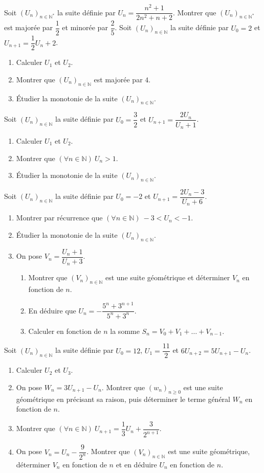 Soit $(U_n)_{n\in\mathbb{N}^*}$ la suite définie par $U_n=\dfrac{n^2+1}{2n^2+n+2}$.
Montrer que $(U_n)_{n\in\mathbb{N}^*}$ est majorée par $\dfrac12$ et minorée par $\dfrac25$.
\fin
Soit $(U_n)_{n\in\mathbb{N}}$ la suite définie par $U_0=2$ et $U_{n+1}=\dfrac12U_n+2$.
\begin{enumerate}
\item Calculer $U_1$ et $U_2$.
\item Montrer que $(U_n)_{n\in\mathbb{N}}$ est majorée par $4$.
\item Étudier la monotonie de la suite $(U_n)_{n\in\mathbb{N}}$.
\end{enumerate}
\fin
{}
Soit $(U_n)_{n\in\mathbb{N}}$ la suite définie par $U_0=\dfrac32$ et $U_{n+1}=\dfrac{2U_n}{U_n+1}$.
\begin{enumerate}
\item Calculer $U_1$ et $U_2$.
\item Montrer que $(\forall n\in\mathbb{N})\ U_n>1$.
\item Étudier la monotonie de la suite $(U_n)_{n\in\mathbb{N}}$.
\end{enumerate}
\fin
{}
Soit $(U_n)_{n\in\mathbb{N}}$ la suite définie par $U_0=-2$ et $U_{n+1}=\dfrac{2U_n-3}{U_n+6}$.
\begin{enumerate}
\item Montrer par récurrence que $(\forall n\in\mathbb{N})\ -3<U_n<-1$.
\item Étudier la monotonie de la suite $(U_n)_{n\in\mathbb{N}}$.
\item On pose $V_n=\dfrac{U_n+1}{U_n+3}$.
\begin{enumerate}
\item Montrer que $(V_n)_{n\in\mathbb{N}}$ est une suite géométrique et déterminer $V_n$ en fonction de $n$.
\item En déduire que $U_n=-\dfrac{5^n+3^{n+1}}{5^n+3^n}$.
\item Calculer en fonction de $n$ la somme $S_n=V_0+V_1+\dots+V_{n-1}$.
\end{enumerate}
\end{enumerate}
\fin
{}
Soit $(U_n)_{n\in\mathbb{N}}$ la suite définie par $U_0=12$, $U_1=\dfrac{11}{2}$ et $6U_{n+2}=5U_{n+1}-U_n$.
\begin{enumerate}
\item Calculer $U_2$ et $U_3$.
\item On pose $W_n=3U_{n+1}-U_n$. Montrer que $(w_n)_{n\geq0}$ est une suite géométrique en précisant sa raison, puis déterminer le terme général $W_n$ en fonction de $n$.
\item Montrer que $(\forall n\in\mathbb{N})\ U_{n+1}=\dfrac13U_n+\dfrac{3}{2^{n+1}}$.
\item On pose $V_n=U_n-\dfrac{9}{2^n}$. Montrer que $(V_n)_{n\in\mathbb{N}}$ est une suite géométrique, déterminer $V_n$ en fonction de $n$ et en déduire $U_n$ en fonction de $n$.
\end{enumerate}
